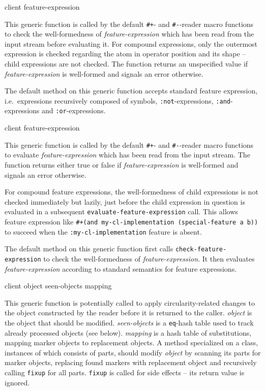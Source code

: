 {client feature-expression}

This generic function is called by the default \texttt{\#+}- and
\texttt{\#-}-reader macro functions to check the well-formedness of
\textit{feature-expression} which has been read from the input stream
before evaluating it.  For compound expressions, only the outermost
expression is checked regarding the atom in operator position and its
shape -- child expressions are not checked.  The function returns an
unspecified value if \textit{feature-expression} is well-formed and
signals an error otherwise.

The default method on this generic function accepts standard
\commonlisp{} feature expression, i.e.\ expressions recursively
composed of symbols, \texttt{:not}-expressions,
\texttt{:and}-expressions and \texttt{:or}-expressions.

 {client feature-expression}

This generic function is called by the default \texttt{\#+}- and
\texttt{\#-}-reader macro functions to evaluate
\textit{feature-expression} which has been read from the input stream.
The function returns either true or false if
\textit{feature-expression} is well-formed and signals an error
otherwise.

For compound feature expressions, the well-formedness of child
expressions is not checked immediately but lazily, just before the
child expression in question is evaluated in a subsequent
\texttt{evaluate-feature-expression} call.  This allows feature
expression like \texttt{\#+(and my-cl-implementation (special-feature
  a b))} to succeed when the \texttt{:my-cl-implementation} feature is
absent.

The default method on this generic function first calls
\texttt{check-feature-expression} to check the well-formedness of
\textit{feature-expression}.  It then evaluates
\textit{feature-expression} according to standard \commonlisp{}
semantics for feature expressions.

 {client object seen-objects mapping}

This generic function is potentially called to apply
circularity-related changes to the object constructed by the reader
before it is returned to the caller.  \textit{object} is the object
that should be modified.  \textit{seen-objects} is a \texttt{eq}-hash
table used to track already processed objects (see below).
\textit{mapping} is a hash table of substitutions, mapping marker
objects to replacement objects.  A method specialized on a class,
instances of which consists of parts, should modify \textit{object} by
scanning its parts for marker objects, replacing found markers with
replacement object and recursively calling \texttt{fixup} for all
parts.  \texttt{fixup} is called for side effects -- its return value
is ignored.


